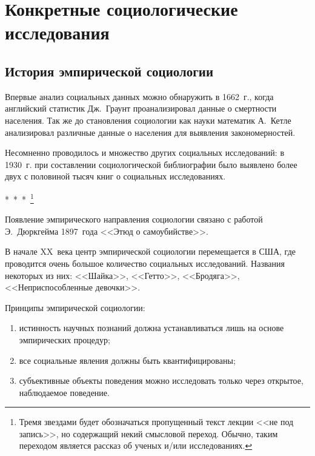 \chapter{Конкретные социологические исследования}
\section{История эмпирической социологии}

  Впервые анализ социальных данных можно обнаружить в 1662~г., когда английский
  статистик Дж.~Граунт проанализировал данные о смертности населения. Так же до
  становления социологии как науки математик А.~Кетле анализировал различные
  данные о населения для выявления закономерностей.
  
  Несомненно проводилось и множество других социальных исследований: в 1930~г.
  при составлении социологической библиографии было выявлено более двух с
  половиной тысяч книг о социальных исследованиях.
  
  \begin{center}
    \vspace{-1ex}
    *\ *\ *\
    \footnote{ Тремя звездами будет обозначаться пропущенный текст лекции <<не
      под запись>>, но содержащий некий смысловой переход. Обычно, таким
      переходом является рассказ об ученых и/или исследованиях.}
    \vspace{-1ex}
  \end{center}
  
  Появление эмпирического направления социологии связано с работой Э.~Дюркгейма
  1897~года <<Этюд о самоубийстве>>.
  
  В начале XX~века центр эмпирической социологии перемещается в США, где
  проводится очень большое количество социальных исследований. Названия
  некоторых из них: <<Шайка>>, <<Гетто>>, <<Бродяга>>, <<Неприспособленные
  девочки>>.
  
  \charskip{*}
  
  Принципы эмпирической социологии:
  \begin{enumerate}
    \item истинность научных познаний должна устанавливаться лишь на основе
      эмпирических процедур;
    \item все социальные явления должны быть квантифицированы;
    \item субъективные объекты поведения можно исследовать только через
      открытое, наблюдаемое поведение.
  \end{enumerate}
  
